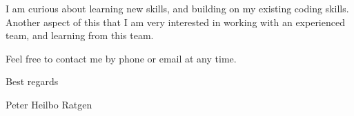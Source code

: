 \documentclass{article}
\begin{document}
I am curious about learning new skills, and building on my existing coding
skills. Another aspect of this that I am very interested in working with an
experienced team, and learning from this team.

Feel free to contact me by phone or email at any time. \vspace{\baselineskip}

\begin{flushleft}
Best regards 

\vspace{\baselineskip} Peter Heilbo Ratgen
\end{flushleft}
\end{document}
